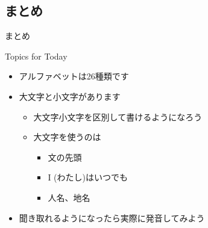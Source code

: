 \documentclass[aspectratio=169,xcolor={dvipsnames,table}]{beamer}
\begin{document}
\subsection{まとめ}
\begin{frame}[plain,label=matome]{まとめ}
  \begin{block}{Topics for Today}
\small
\pause
\begin{itemize}[square]
 \item アルファベットは26種類です\pause
 \item 大文字と小文字があります\pause
       \begin{itemize}
	\item 大文字小文字を区別して書けるようになろう\pause
        \item 大文字を使うのは\pause
              \begin{itemize}
	       \item 文の先頭\pause
	       \item \textrm{I}\,\,(わたし)はいつでも\pause
	       \item 人名、地名\pause
	      \end{itemize}
       \end{itemize}
 \item 聞き取れるようになったら実際に発音してみよう
\end{itemize}
      \end{block}
\end{frame}
\end{document}

